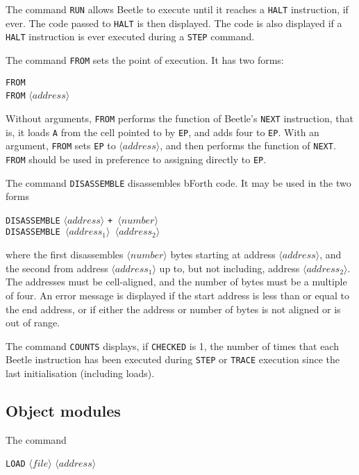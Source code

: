 \documentclass[english]{article}
\newcommand{\angb}[1]{$\langle #1\rangle$}
\begin{document}
The command {\tt RUN} allows Beetle to execute until it reaches a {\tt HALT}
instruction, if ever. The code passed to {\tt HALT} is then displayed. The
code is also displayed if a {\tt HALT} instruction is ever executed during a
{\tt STEP} command.

\label{from}
The command {\tt FROM} sets the point of execution. It has two forms:

\begin{center}
{\tt FROM}\\
{\tt FROM} \angb{address}
\end{center}

Without arguments, {\tt FROM} performs the function of Beetle's {\tt NEXT}
instruction, that is, it loads {\tt A} from the cell pointed to by {\tt EP},
and adds four to {\tt EP}. With an argument, {\tt FROM} sets {\tt EP} to
\angb{address}, and then performs the function of {\tt NEXT}. {\tt FROM}
should be used in preference to assigning directly to {\tt EP}.

The command {\tt DISASSEMBLE} disassembles bForth code. It may be used in the
two forms

\begin{center}
{\tt DISASSEMBLE} \angb{address} \tt{+} \angb{number}\\
{\tt DISASSEMBLE} \angb{address_1} \angb{address_2}
\end{center}

where the first disassembles \angb{number} bytes starting at address
\angb{address}, and the second from address \angb{address_1} up to, but not
including, address \angb{address_2}. The addresses must be cell-aligned, and
the number of bytes must be a multiple of four. An error message is displayed
if the start address is less than or equal to the end address, or if either
the address or number of bytes is not aligned or is out of range.

The command {\tt COUNTS} displays, if {\tt CHECKED} is 1, the number of times
that each Beetle instruction has been executed during {\tt STEP} or {\tt TRACE} execution since the last initialisation
(including loads).

\subsection{Object modules}

The command

\label{uifaceload}
\begin{center}{\tt LOAD} \angb{file} \angb{address}\end{center}
\end{document}
